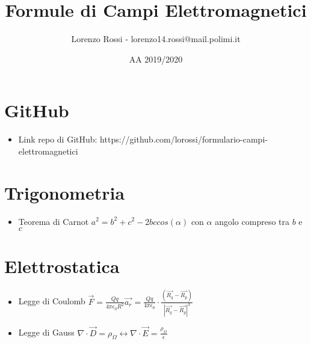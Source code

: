 \documentclass{article}
\title{Formule di Campi Elettromagnetici}
\author{Lorenzo Rossi - lorenzo14.rossi@mail.polimi.it}
\date{AA 2019/2020}
\begin{document}
\maketitle

\section{GitHub}
\begin{itemize}
	\item Link repo di GitHub: https://github.com/lorossi/formulario-campi-elettromagnetici
\end{itemize}

\section{Trigonometria}
\begin{itemize}
	\item Teorema di Carnot \( a^2 = b^2 + c^2 - 2bccos(\alpha)\) con \(\alpha\) angolo compreso tra \(b\) e \(c\) 
\end{itemize}

\section{Elettrostatica}
\begin{itemize}
	\item Legge di Coulomb \( \vec{F} = \frac{Qq}{4 \pi \epsilon_0 R^2} \vec{a_r} = \frac{Qq}{4 \pi \epsilon_0} \cdot \frac{(\vec{R_q} - \vec{R_p})}{| \vec{R_q} - \vec{R_p} | ^3 } \)
	\item Legge di Gauss \( \nabla \cdot \vec{D} = \rho_\Omega \leftrightarrow \nabla \cdot \vec{E} = \frac{\rho_\Omega}{\epsilon} \)
\end{itemize}
\end{document}
